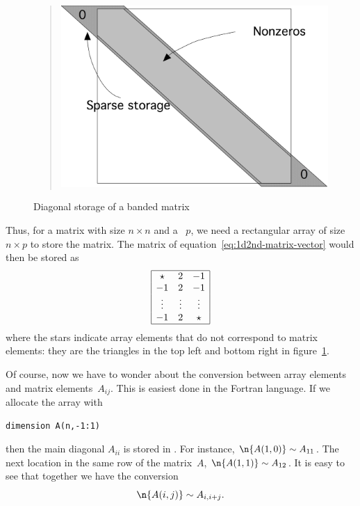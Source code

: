 \begin{figure}[ht]
  \begin{quote}
    \includegraphics[scale=.1]{graphics/sparsediag}
  \end{quote}
  \caption{Diagonal storage of a banded matrix}
  \label{fig:sparsediag}
\end{figure}

Thus, for a matrix with size $n\times n$ and a
~$p$, we need a
rectangular array of size $n\times p$ to store the matrix. The matrix
of equation~\eqref{eq:1d2nd-matrix-vector} would then be stored as
\begin{equation}
\begin{array}{|ccc|}
  \hline
  \star&2&-1\\
  -1&2&-1\\
  \vdots&\vdots&\vdots\\
  -1&2&\star\\ \hline
\end{array}
\label{eq:2minus1-by-diagonals}
\end{equation}
where the stars indicate array elements that do not correspond to
matrix elements: they are the triangles in the top left and bottom
right in figure~\ref{fig:sparsediag}. 

Of course, now we have to wonder about the conversion between array
elements  and matrix elements~$A_{ij}$. This is easiest done
in the Fortran language. If we allocate the array with
\begin{verbatim}
dimension A(n,-1:1)
\end{verbatim}
then the main diagonal $A_{ii}$ is stored in . For instance,
%
$\n{A(1,0)}\sim A_{11}$. The next location in the same row of the matrix~$A$, 
%
$\n{A(1,1)}\sim A_{12}$. It is easy to see that together we have the
conversion
\begin{equation}
  \n{A(i,j)}\sim A_{i,i+j}.
  \label{eq:sparse-conversion}
\end{equation}

